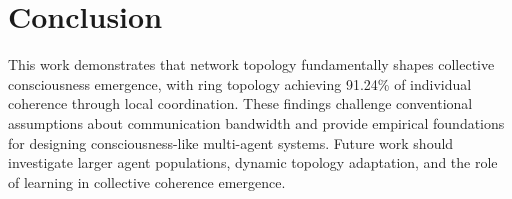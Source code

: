 \documentclass[10pt,letterpaper]{article}
\begin{document}
\section*{Conclusion}
This work demonstrates that network topology fundamentally shapes collective consciousness emergence, with ring topology achieving 91.24\% of individual coherence through local coordination. These findings challenge conventional assumptions about communication bandwidth and provide empirical foundations for designing consciousness-like multi-agent systems. Future work should investigate larger agent populations, dynamic topology adaptation, and the role of learning in collective coherence emergence.



\end{document}
